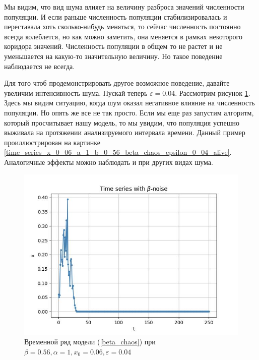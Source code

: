     Мы видим, что вид шума влияет на величину разброса значений численности популяции.  И если раньше численность популяции стабилизировалась и переставала хоть сколько-нибудь меняться, то сейчас численность постоянно всегда колеблется, но как можно заметить, она меняется в рамках некоторого коридора значений. Численность популяции в общем то не растет и не уменьшается на какую-то значительную величину. Но такое поведение наблюдается не всегда.




    Для того чтоб продемонстрировать другое возможное поведение, давайте увеличим интенсивность шума. Пускай теперь \(\varepsilon = 0.04\). Рассмотрим рисунок \ref{time_series_x_0_06_a_1_b_0_56_beta_chaos_epsilon_0_04_fall}. Здесь мы видим ситуацию, когда шум оказал негативное влияние на численность популяции. Но опять же все не так просто. Если мы еще раз запустим алгоритм, который просчитывает нашу модель, то мы увидим, что популяция успешно выживала на протяжении анализируемого интервала времени. Данный пример проиллюстрирован на картинке \ref{time_series_x_0_06_a_1_b_0_56_beta_chaos_epsilon_0_04_alive}. Аналогичные эффекты можно наблюдать и при других видах шума.


    \begin{figure}
        \centering
        \includegraphics[width=\textwidth]{stochastic/images/time_series_x_0_06_a_1_b_0_56_beta_chaos_epsilon_0_04_fall.jpg}
        
        \captionsetup{justification=centering}
        \caption{Временной ряд модели (\ref{beta_chaos}) при \(\beta = 0.56, \alpha = 1, x_0 = 0.06, \varepsilon = 0.04\)}
        \label{time_series_x_0_06_a_1_b_0_56_beta_chaos_epsilon_0_04_fall}
    \end{figure}

